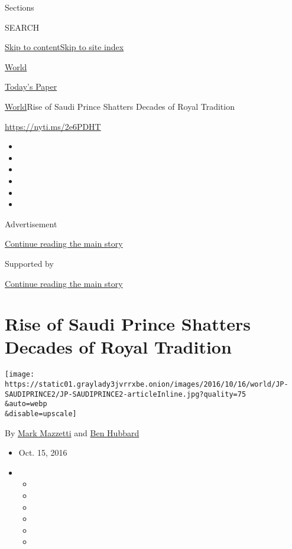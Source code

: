 Sections

SEARCH

\protect\hyperlink{site-content}{Skip to
content}\protect\hyperlink{site-index}{Skip to site index}

\href{https://www.nytimes3xbfgragh.onion/section/world}{World}

\href{https://myaccount.nytimes3xbfgragh.onion/auth/login?response_type=cookie\&client_id=vi}{}

\href{https://www.nytimes3xbfgragh.onion/section/todayspaper}{Today's
Paper}

\href{/section/world}{World}\textbar{}Rise of Saudi Prince Shatters
Decades of Royal Tradition

\url{https://nyti.ms/2e6PDHT}

\begin{itemize}
\item
\item
\item
\item
\item
\item
\end{itemize}

Advertisement

\protect\hyperlink{after-top}{Continue reading the main story}

Supported by

\protect\hyperlink{after-sponsor}{Continue reading the main story}

\hypertarget{rise-of-saudi-prince-shatters-decades-of-royal-tradition}{%
\section{Rise of Saudi Prince Shatters Decades of Royal
Tradition}\label{rise-of-saudi-prince-shatters-decades-of-royal-tradition}}

\texttt{[image: https://static01.graylady3jvrrxbe.onion/images/2016/10/16/world/JP-SAUDIPRINCE2/JP-SAUDIPRINCE2-articleInline.jpg?quality=75\\\&auto=webp\\\&disable=upscale]}

By \href{http://www.nytimes3xbfgragh.onion/by/mark-mazzetti}{Mark
Mazzetti} and
\href{http://www.nytimes3xbfgragh.onion/by/ben-hubbard}{Ben Hubbard}

\begin{itemize}
\item
  Oct. 15, 2016
\item
  \begin{itemize}
  \item
  \item
  \item
  \item
  \item
  \item
  \end{itemize}
\end{itemize}


